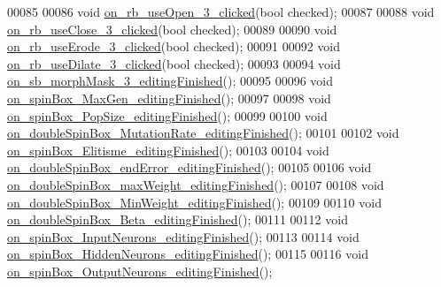 \begin{DoxyCode}
00085 
00086   \textcolor{keywordtype}{void} \hyperlink{class_dialog_settings_af9143e7adfb0e07b94d6c3dcfd851178}{on\_rb\_useOpen\_3\_clicked}(\textcolor{keywordtype}{bool} checked);
00087 
00088   \textcolor{keywordtype}{void} \hyperlink{class_dialog_settings_a30b98652c0e2e76bedf94194eba32212}{on\_rb\_useClose\_3\_clicked}(\textcolor{keywordtype}{bool} checked);
00089 
00090   \textcolor{keywordtype}{void} \hyperlink{class_dialog_settings_ac26a73f5f28eadc10b77fd7fe58a5a43}{on\_rb\_useErode\_3\_clicked}(\textcolor{keywordtype}{bool} checked);
00091 
00092   \textcolor{keywordtype}{void} \hyperlink{class_dialog_settings_a02cf8145814a1a2d012001ecb95febfd}{on\_rb\_useDilate\_3\_clicked}(\textcolor{keywordtype}{bool} checked);
00093 
00094   \textcolor{keywordtype}{void} \hyperlink{class_dialog_settings_a23694b9ccf8039028fd2ab6be697a1a3}{on\_sb\_morphMask\_3\_editingFinished}();
00095 
00096   \textcolor{keywordtype}{void} \hyperlink{class_dialog_settings_ac243e39cfe6dea2e101e92916bd96a07}{on\_spinBox\_MaxGen\_editingFinished}();
00097 
00098   \textcolor{keywordtype}{void} \hyperlink{class_dialog_settings_a86f5de4b60bc75e7328bb4103b0b17bf}{on\_spinBox\_PopSize\_editingFinished}();
00099 
00100   \textcolor{keywordtype}{void} \hyperlink{class_dialog_settings_aca1680d915f5237c05259cb6f5a8da59}{on\_doubleSpinBox\_MutationRate\_editingFinished}();
00101 
00102   \textcolor{keywordtype}{void} \hyperlink{class_dialog_settings_aef0a13201f0159b7f4972b1048caf46e}{on\_spinBox\_Elitisme\_editingFinished}();
00103 
00104   \textcolor{keywordtype}{void} \hyperlink{class_dialog_settings_ac8c3a2a0b37eef330f59240d6d88aa31}{on\_doubleSpinBox\_endError\_editingFinished}();
00105 
00106   \textcolor{keywordtype}{void} \hyperlink{class_dialog_settings_a8f26d4080f8c07e11210f927b8a532b2}{on\_doubleSpinBox\_maxWeight\_editingFinished}();
00107 
00108   \textcolor{keywordtype}{void} \hyperlink{class_dialog_settings_aeef94f22e69a58b76b0c81447d2b8fe0}{on\_doubleSpinBox\_MinWeight\_editingFinished}();
00109 
00110   \textcolor{keywordtype}{void} \hyperlink{class_dialog_settings_aaac9a0c84d1461fa0753b67466239ee3}{on\_doubleSpinBox\_Beta\_editingFinished}();
00111 
00112   \textcolor{keywordtype}{void} \hyperlink{class_dialog_settings_a5c7f94065123d8302ece6261d80c630d}{on\_spinBox\_InputNeurons\_editingFinished}();
00113 
00114   \textcolor{keywordtype}{void} \hyperlink{class_dialog_settings_a149a62295a8a2f197194879d9a1bd2aa}{on\_spinBox\_HiddenNeurons\_editingFinished}();
00115 
00116   \textcolor{keywordtype}{void} \hyperlink{class_dialog_settings_a85c6fccd4ff1e7e2f18b2626ca32f57f}{on\_spinBox\_OutputNeurons\_editingFinished}();

\end{DoxyCode}
